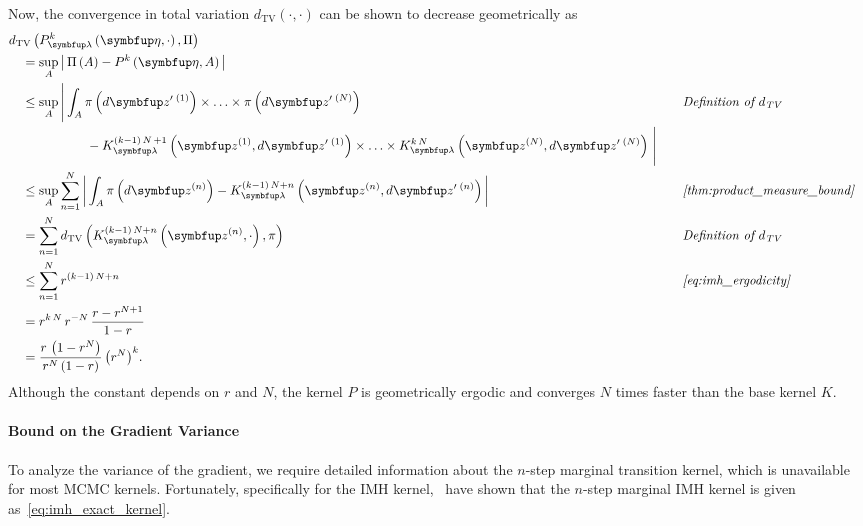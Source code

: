\begin{proofEnd}
  Now, the convergence in total variation \(d_{\mathrm{TV}}\left(\cdot, \cdot\right)\) can be shown to decrease geometrically as
  \begin{alignat}{2}
    &\DTV{P_{\vlambda}^{k}\left(\veta, \cdot\right)}{\Pi}
    \nonumber
    \\
    &\quad=
    \sup_{A}
    \abs{
      \Pi\left(A\right)
      -
      P^{k}\left(\veta, A\right)
    }
    \nonumber
    \\
    &\quad\leq
    \sup_{A}
    \Bigg|
    \int_{A}
      \pi\left(d\vz^{\prime\;(1)}\right) \times \ldots \times \pi\left(d\vz^{\prime\;(N)}\right)
    \nonumber
    &&\quad\text{\textit{Definition of \(d_{\text{TV}}\)}}
      \\
      &\qquad\qquad\qquad-
      K^{(k-1)\,N\,+1}_{\vlambda}\left(\vz^{(1)}, d\vz^{\prime\;(1)}\right) \times \ldots \times K^{k\,N}_{\vlambda}\left(\vz^{(N)}, d\vz^{\prime\;(N)}\right)
    \,\Bigg|
    \nonumber
    \\
    &\quad\leq
    \sup_{A}
    \sum_{n=1}^N
    \abs{
    \int_{A}
      \pi\left(d\vz^{(n)}\right) - K^{(k-1)\,N + n}_{\vlambda}\left(\vz^{(n)}, d\vz^{\prime\;(n)}\right) 
    }
    &&\quad\text{\textit{\cref{thm:product_measure_bound}}}
    \nonumber
    \\
    &\quad=
    \sum_{n=1}^N
    \DTV{K^{(k-1)\,N + n}_{\vlambda}\left(\vz^{(n)}, \cdot\right)}{\pi}
    &&\quad\text{\textit{Definition of \(d_{\text{TV}}\)}}
    \nonumber
    \\
    &\quad\leq
    \sum_{n=1}^N
    r^{(k-1)\,N + n}
    &&\quad\text{\textit{\cref{eq:imh_ergodicity}}}
    \nonumber
    \\
    &\quad=
    r^{k\,N}
    \,
    r^{-N}
    \,
    \frac{r - r^{N+1}}{1 - r}
    \nonumber
    \\
    &\quad=
    \frac{r \, \left(1 - r^N\right)}{r^N \left(1 - r\right)}
    \,
    {\left( r^{N} \right)}^k.
    \nonumber
  \end{alignat}
  Although the constant depends on \(r\) and \(N\), the kernel \(P\) is geometrically ergodic and converges \(N\) times faster than the base kernel \(K\).

  \paragraph{\textbf{Bound on the Gradient Variance}}
  To analyze the variance of the gradient, we require detailed information about the \(n\)-step marginal transition kernel, which is unavailable for most MCMC kernels.
  Fortunately, specifically for the IMH kernel,~\citet{Smith96exacttransition} have shown that the \(n\)-step marginal IMH kernel is given as~\cref{eq:imh_exact_kernel}.


\end{proofEnd}
